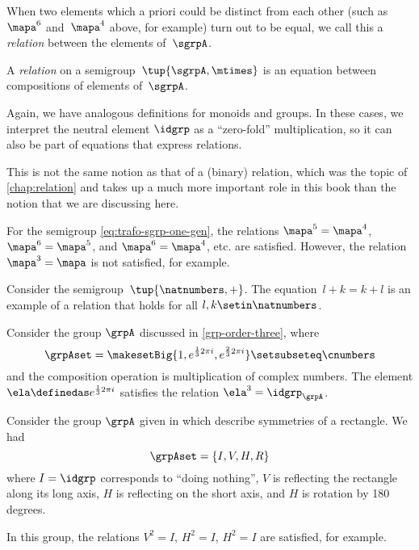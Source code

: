When two elements which a priori could be distinct from each other (such as~$\mapa^6$ and~$\mapa^4$ above, for example) turn out to be equal, we call this a \emph{relation} between the elements of~$\sgrpA$.

\begin{ctdefinition}
    A \emph{relation} on a semigroup~$\tup{\sgrpA, \mtimes}$ is an equation between compositions of elements of~$\sgrpA$.
\end{ctdefinition}

\begin{remark}
Again, we have analogous definitions for monoids and groups. In these cases, we interpret the neutral element $\idgrp$ as a ``zero-fold'' multiplication, so it can also be part of equations that express relations. 
\end{remark}

\begin{remark}
This is not the same notion as that of a (binary) relation, which was the topic of \cref{chap:relation} and takes up a much more important role in this book than the notion that we are discussing here.
\end{remark}

\begin{example}
For the semigroup \cref{eq:trafo-sgrp-one-gen}, the relations $\mapa^5 = \mapa^4$, $\mapa^6 = \mapa^5$, and $\mapa^6 = \mapa^4$, etc. are satisfied. However, the relation $\mapa^3 = \mapa$ is not satisfied, for example. 

\end{example}

\begin{example}
    Consider the semigroup~$\tup{\natnumbers, +}$.
    The equation~$l + k = k + l$ is an example of a relation that holds for all $l, k \setin \natnumbers$.
\end{example}

\begin{example}
 Consider the group $\grpA$ discussed in \cref{grp-order-three}, where
    \begin{equation}
        \grpAset = \makesetBig{ 1, e^{\frac{1}{3}2\pi i}, e^{\frac{2 }{3}2\pi i} } \setsubseteq \cnumbers
    \end{equation}
and the composition operation is multiplication of complex numbers. The element $\ela \definedas e^{\frac{1}{3}2\pi i}$ satisfies the relation $\ela^3 = \idgrp_\grpA$. 
\end{example}

\begin{example}
Consider the group $\grpA$ given in \label{exa:grp-Klein4} which describe symmetries of a rectangle. We had
\begin{equation}
\grpAset = \{ I, V, H, R\}
\end{equation}
where $I = \idgrp$ corresponds to ``doing nothing'', $V$ is reflecting the rectangle along its long axis, $H$ is reflecting on the short axis, and $H$ is rotation by 180 degrees. 

In this group, the relations $V^2 = I$, $H^2 = I$, $H^2 = I$ are satisfied, for example. 
\end{example}




